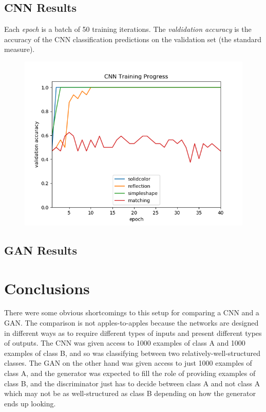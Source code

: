 \documentclass{article}
\renewcommand{\it}{\textit}
\begin{document}
\subsection{CNN Results}

Each \it{epoch} is a batch of 50 training iterations.
The \it{valdidation accuracy} is the accuracy of the CNN classification predictions on the validation set (the standard measure).

\begin{figure}[ht]
\centering
\includegraphics[width=\textwidth]{cnn-results.png}
\end{figure}

\subsection{GAN Results}





\section{Conclusions}

There were some obvious shortcomings to this setup for comparing a CNN and a GAN.
The comparison is not apples-to-apples because the networks are designed in different ways as to require different types of inputs and present different types of outputs.
The CNN was given access to 1000 examples of class A and 1000 examples of class B, and so was classifying between two relatively-well-structured classes.
The GAN on the other hand was given access to just 1000 examples of class A, and the generator was expected to fill the role of providing examples of class B, and the discriminator just has to decide between class A and not class A which may not be as well-structured as class B depending on how the generator ends up looking.
\end{document}
